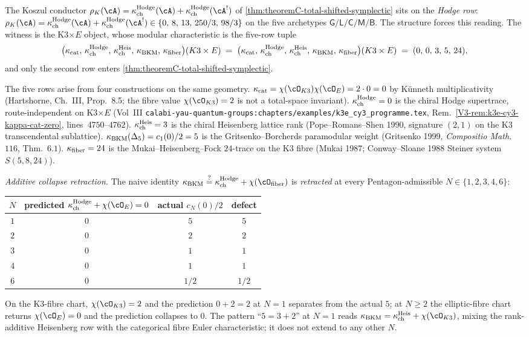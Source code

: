 \begin{remark}
\label{rem:theoremC-K3E-kappa-tuple-witness}
%
%
The Koszul conductor $\rho_K(\cA) = \kappaChHodge(\cA) + \kappaChHodge(\cA^!)$
of \cref{thm:theoremC-total-shifted-symplectic} sits on the
\emph{Hodge row}: $\rho_K(\cA) = \kappaChHodge(\cA) +
\kappaChHodge(\cA^!) \in \{0,\, 8,\, 13,\, 250/3,\, 98/3\}$ on
the five archetypes $\mathsf{G/L/C/M/B}$. The structure forces
this reading. The witness is the K3$\times E$ object, whose
modular characteristic is the five-row tuple
\[
 \bigl(\kappa_{\mathrm{cat}},\, \kappa_{\mathrm{ch}}^{\mathrm{Hodge}},\, \kappa_{\mathrm{ch}}^{\mathrm{Heis}},\, \kappa_{\mathrm{BKM}},\, \kappa_{\mathrm{fiber}}\bigr)(K3 \times E)
 \;=\;
 \bigl(\kappa_{\mathrm{cat}},\, \kappa_{\mathrm{ch}}^{\mathrm{Hodge}},\, \kappa_{\mathrm{ch}}^{\mathrm{Heis}},\, \kappa_{\mathrm{BKM}},\, \kappa_{\mathrm{fiber}}\bigr)(K3 \times E)
 \;=\;
 (0,\, 0,\, 3,\, 5,\, 24),
\]
and only the second row enters
\cref{thm:theoremC-total-shifted-symplectic}.

The five rows arise from four constructions on the same geometry.
$\kappaCat = \chi(\cO_{K3}) \chi(\cO_E) = 2 \cdot 0 = 0$ by
K\"unneth multiplicativity (Hartshorne, Ch.~III, Prop.~8.5; the
fibre value $\chi(\cO_{K3}) = 2$ is not a total-space invariant).
$\kappa_{\mathrm{ch}}^{\mathrm{Hodge}} = 0$ is the chiral Hodge supertrace,
route-independent on K3$\times E$ (Vol~III
\texttt{calabi-yau-quantum-groups:chapters/examples/k3e\_cy3\_programme.tex},
Rem.~\ref*{V3-rem:k3e-cy3-kappa-cat-zero}, lines~$4750$--$4762$).
$\kappa_{\mathrm{ch}}^{\mathrm{Heis}} = 3$ is the chiral Heisenberg lattice rank
(Pope--Romans--Shen 1990, signature $(2, 1)$ on the K3
transcendental sublattice).
$\kappa_{\mathrm{BKM}}(\Delta_5) = c_1(0)/2 = 5$ is the
Gritsenko--Borcherds paramodular weight (Gritsenko 1999,
\emph{Compositio Math.}~$116$, Thm.~$6.1$).
$\kappa_{\mathrm{fiber}} = 24$ is the Mukai--Heisenberg--Fock $24$-trace on
the K3 fibre (Mukai 1987; Conway--Sloane 1988 Steiner system
$S(5, 8, 24)$).

\emph{Additive collapse retraction.} The naive identity
$\kappaBKM \stackrel{?}{=} \kappaChHodge +
\chi(\cO_{\mathrm{fiber}})$ is \emph{retracted} at every
Pentagon-admissible $N \in \{1, 2, 3, 4, 6\}$:
\begin{center}
\renewcommand{\arraystretch}{1.2}
\begin{tabular}{c|c|c|c}
$N$ & predicted $\kappaChHodge + \chi(\cO_E) = 0$ & actual $c_N(0)/2$ & defect \\
\hline
$1$ & $0$ & $5$ & $5$ \\
$2$ & $0$ & $2$ & $2$ \\
$3$ & $0$ & $1$ & $1$ \\
$4$ & $0$ & $1$ & $1$ \\
$6$ & $0$ & $1/2$ & $1/2$ \\
\end{tabular}
\end{center}
On the K3-fibre chart, $\chi(\cO_{K3}) = 2$ and the prediction
$0 + 2 = 2$ at $N = 1$ separates from the actual $5$; at
$N \ge 2$ the elliptic-fibre chart returns $\chi(\cO_E) = 0$ and
the prediction collapses to $0$. The pattern ``$5 = 3 + 2$'' at
$N = 1$ reads $\kappaBKM = \kappaChHeis + \chi(\cO_{K3})$,
mixing the rank-additive Heisenberg row with the categorical fibre
Euler characteristic; it does not extend to any other $N$.


\end{remark}
